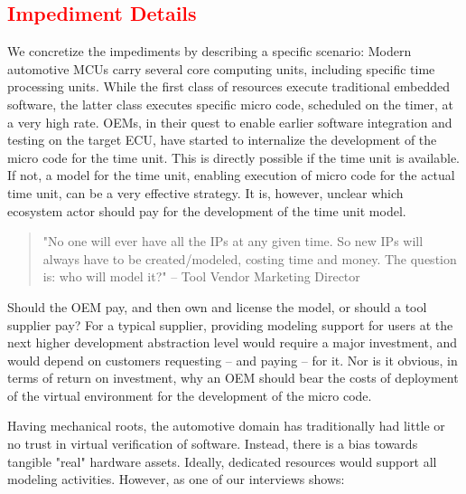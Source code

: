 \subsection{\textcolor{red}{Impediment Details}}
We concretize the impediments 
by describing a specific scenario:
Modern automotive MCUs carry several core computing units, including specific time processing units.
While the first class of resources execute traditional embedded software, the latter class executes specific micro code, scheduled on the timer, at a very high rate.
OEMs, in their quest to enable earlier software integration and testing on the target ECU, have started to internalize the development of the micro code for the time unit.
This is directly possible if the time unit is available.
If not, a model for the time unit, enabling execution of micro code for the actual time unit, can be a very effective strategy.
It is, however, unclear which ecosystem actor should pay for the development of the time unit model.

\begin{quote}
"No one will ever have all the IPs at any given time. So new IPs will always have to be created/modeled, costing time and money. The question is: who will model it?"
-- Tool Vendor Marketing Director
\end{quote}

Should the OEM pay, and then own and license the model, or should a tool supplier pay?
For a typical supplier, providing modeling support for users at the next higher development abstraction level would require a major investment, and would depend on customers requesting -- and paying -- for it.
Nor is it obvious, in terms of return on investment, why an OEM should bear the costs of deployment of the virtual environment for the development of the micro code.


Having mechanical roots, the automotive domain has traditionally had little or no trust in virtual verification of software.
Instead, there is a bias towards tangible "real" hardware assets.
Ideally, dedicated resources would support all modeling activities.
However, as one of our interviews shows:

